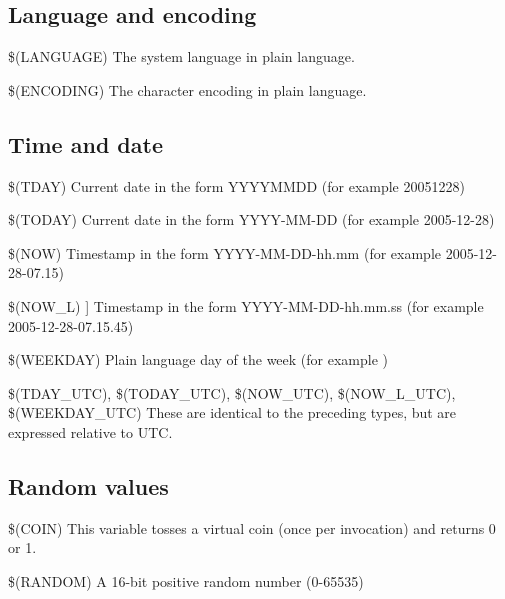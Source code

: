\subsection{Language and encoding}

\begin{codeentry}
\item[\$(LANGUAGE)] The system language in plain language.
\item[\$(ENCODING)] The character encoding in plain language.
\end{codeentry}

\subsection{Time and date}

\begin{codeentry}
\item[\$(TDAY)] Current date in the form YYYYMMDD (for example 20051228)
\item[\$(TODAY)] Current date in the form YYYY-MM-DD (for example 2005-12-28)
\item[\$(NOW)] Timestamp in the form YYYY-MM-DD-hh.mm (for example 2005-12-28-07.15)
\item[\$(NOW\_L)]] Timestamp in the form YYYY-MM-DD-hh.mm.ss (for example 2005-12-28-07.15.45)
\item[\$(WEEKDAY)]  Plain language day of the week (for example )
\item[\$(TDAY\_UTC), \$(TODAY\_UTC), \$(NOW\_UTC), \$(NOW\_L\_UTC), \$(WEEKDAY\_UTC)] These are identical to the preceding types, but are expressed relative to UTC.
\end{codeentry}

\subsection{Random values}

\begin{codeentry}
\item[\$(COIN)] This variable tosses a virtual coin (once per invocation) and returns 0 or 1.
\item[\$(RANDOM)] A 16-bit positive random number (0-65535)
\end{codeentry}

